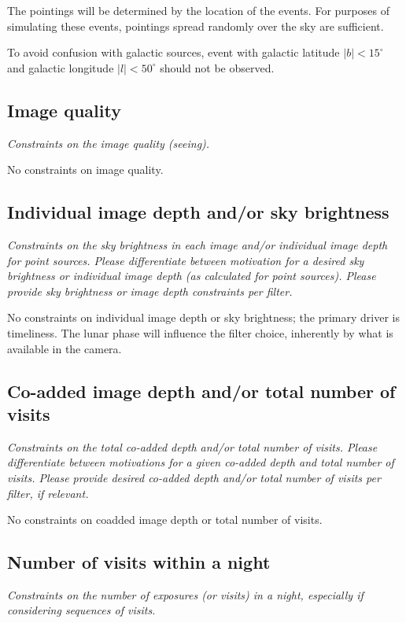 \documentclass[12pt, letterpaper]{article}
\begin{document}
The pointings will be determined by the location of the events. For purposes of simulating these events,
pointings spread randomly over the sky are sufficient. 

To avoid confusion with galactic sources, event with galactic latitude $|b| < 15^\circ$ and galactic 
longitude $|l| < 50^\circ$ should not be observed.

\subsection{Image quality}
\begin{footnotesize}{\it Constraints on the image quality (seeing).}\end{footnotesize}

No constraints on image quality.

\subsection{Individual image depth and/or sky brightness}
\begin{footnotesize}{\it Constraints on the sky brightness in each image and/or individual image depth for point sources.
Please differentiate between motivation for a desired sky brightness or individual image depth (as 
calculated for point sources). Please provide sky brightness or image depth constraints per filter.}
\end{footnotesize}

No constraints on individual image depth or sky brightness; the primary driver is timeliness. 
The lunar phase will influence the filter choice, inherently by what is available in the camera.

\subsection{Co-added image depth and/or total number of visits}
\begin{footnotesize}{\it  Constraints on the total co-added depth and/or total number of visits.
Please differentiate between motivations for a given co-added depth and total number of visits. 
Please provide desired co-added depth and/or total number of visits per filter, if relevant.}
\end{footnotesize}

No constraints on coadded image depth or total number of visits.

\subsection{Number of visits within a night}
\begin{footnotesize}{\it Constraints on the number of exposures (or visits) in a night, especially if considering sequences of visits.  }
\end{footnotesize}
\end{document}
